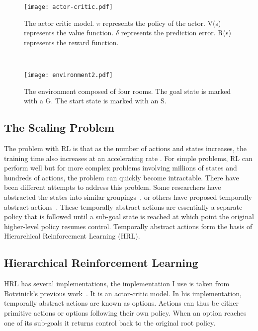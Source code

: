 
\begin{figure*}[h]
    \centering
    \begin{subfigure}[h]{0.49\textwidth}
        \centering
        \texttt{[image: actor-critic.pdf]}
        \caption{The actor critic model. $\pi$ represents the policy of the actor. V(s) represents the value function. $\delta$ represents the prediction error. R(s) represents the reward function.}
		\label{fig:actor-critic}
    \end{subfigure}%
    ~ 
    \begin{subfigure}[h]{0.49\textwidth}
        \centering
        \texttt{[image: environment2.pdf]}
        \caption{The environment composed of four rooms. The goal state is marked with a G. The start state is marked with an S.}
		\label{fig:environment}
    \end{subfigure}
\end{figure*}

\subsection{The Scaling Problem}
The problem with RL is that as the number of actions and states increases, the training time also increases at an accelerating rate \cite{botvinick2009hierarchically}. For simple problems, RL can perform well but for more complex problems involving millions of states and hundreds of actions, the problem can quickly become intractable. There have been different attempts to address this problem. Some researchers have abstracted the states into similar groupings~\cite{li2006towards}, or others have proposed temporally abstract actions~\cite{sutton1999between}. These temporally abstract actions are essentially a separate policy that is followed until a sub-goal state is reached at which point the original higher-level policy resumes control. Temporally abstract actions form the basis of Hierarchical Reinforcement Learning (HRL).

\subsection{Hierarchical Reinforcement Learning}
HRL has several implementations, the implementation I use is taken from Botvinick's previous work~\cite{botvinick2009hierarchically}. It is an actor-critic model. In his implementation, temporally abstract actions are known as options. Actions can thus be either primitive actions or options following their own policy. When an option reaches one of its sub-goals it returns control back to the original root policy. 

